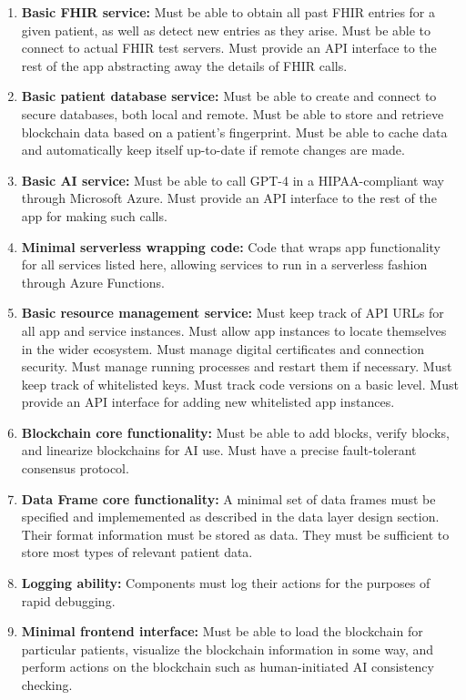 \documentclass[12pt]{article}
\begin{document}
\begin{enumerate}
\item {\bf Basic FHIR service:} Must be able to obtain all past FHIR entries for a given patient, as well as detect new entries as they arise. Must be able to connect to actual FHIR test servers. Must provide an API interface to the rest of the app abstracting away the details of FHIR calls.

\item {\bf Basic patient database service:} Must be able to create and connect to secure databases, both local and remote. Must be able to store and retrieve blockchain data based on a patient's fingerprint. Must be able to cache data and automatically keep itself up-to-date if remote changes are made.

\item {\bf Basic AI service:} \label{module:ai} Must be able to call GPT-4 in a HIPAA-compliant way through Microsoft Azure. Must provide an API interface to the rest of the app for making such calls.

\item {\bf Minimal serverless wrapping code:} Code that wraps app functionality for all services listed here, allowing services to run in a serverless fashion through Azure Functions.

\item {\bf Basic resource management service:} Must keep track of API URLs for all app and service instances. Must allow app instances to locate themselves in the wider ecosystem. Must manage digital certificates and connection security. Must manage running processes and restart them if necessary. Must keep track of whitelisted keys. Must track code versions on a basic level. Must provide an API interface for adding new whitelisted app instances.

\item {\bf Blockchain core functionality:} Must be able to add blocks, verify blocks, and linearize blockchains for AI use. Must have a precise fault-tolerant consensus protocol.

\item {\bf Data Frame core functionality:} A minimal set of data frames must be specified and implememented as described in the data layer design section. Their format information must be stored as data. They must be sufficient to store most types of relevant patient data.

\item {\bf Logging ability:} Components must log their actions for the purposes of rapid debugging.

\item {\bf Minimal frontend interface:} Must be able to load the blockchain for particular patients, visualize the blockchain information in some way, and perform actions on the blockchain such as human-initiated AI consistency checking.
\end{enumerate}
\end{document}
